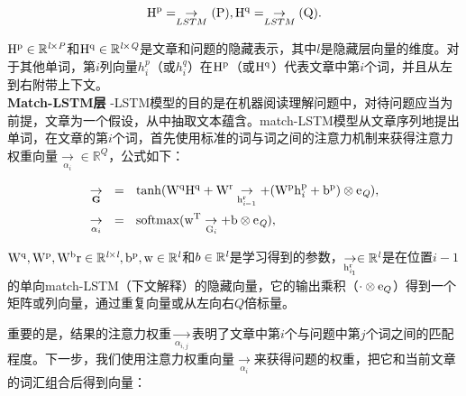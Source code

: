 \documentclass{article}
\begin{document}
\begin{CJK*}{UTF8}{gbsn}
    \begin{equation}                  
        {{\rm H^{p}} = \underset{LSTM}\rightarrow}~{\rm (P)}, {\rm H^{q}} = \underset{LSTM}\rightarrow{\rm (Q)}.              
    \end{equation}

    \vspace{1ex}
    $\rm H^{p}\in \mathbb{R}^{\emph l \times \emph P}$和$\rm H^{q}\in \mathbb{R}^{\emph l \times \emph Q}$是文章和问题的隐藏表示，其中$l$是隐藏层向量的维度。对于其他单词，第$i$列向量$h^{p}_{i}$（或$h^q_{i}$）在$\rm H^{p}$（或$\rm H^{q}$）代表文章中第$i$个词，并且从左到右附带上下文。\\

    \vspace{1ex}
    \noindent\textbf{Match-LSTM层}
    \vspace{1ex}
    -LSTM模型的目的是在机器阅读理解问题中，对待问题应当为前提，文章为一个假设，从中抽取文本蕴含。match-LSTM模型从文章序列地提出单词，在文章的第$i$个词，首先使用标准的词与词之间的注意力机制来获得注意力权重向量$\underset{\alpha_{i}}\rightarrow \in \mathbb{R}^{Q}$，公式如下：

    \begin{equation}
        \begin{split}
            \underset{\textbf G}\rightarrow ~~ &= ~~ \tanh({\rm W^{q}H^{q} + W^{r}\underset{h_{\emph i-1}^{r}}\rightarrow + (W^{p}h_{\emph i}^{p} + b^{p}) \otimes e_{\emph Q}}),\\
            \underset{\alpha_{i}}\rightarrow ~~ &= ~~ \rm softmax(w^{T}\underset{G_{\emph i}}\rightarrow + b \otimes e_{\emph Q}),
        \end{split}
    \end{equation}

    \vspace{1ex}
    $\rm W^{q}, W^{p},W^b{r} \in \mathbb{R}^{\emph l \times \emph l},b^{p},w \in \mathbb{R}^{\emph l}$和$b \in \mathbb{R}^{\emph l}$是学习得到的参数，$\rm \underset{h_{\emph i_1}^{r}}\rightarrow \in \mathbb{R}^{\emph l}$是在位置$i-1$的单向match-LSTM（下文解释）的隐藏向量，它的输出乘积（$\cdot \otimes {\rm e}_{Q}$）得到一个矩阵或列向量，通过重复向量或从左向右$Q$倍标量。

    \vspace{1ex}\noindent
    重要的是，结果的注意力权重$\underset{\alpha_{i, j}}\rightarrow$表明了文章中第$i$个与问题中第$j$个词之间的匹配程度。下一步，我们使用注意力权重向量$\underset{\alpha_{i}}\rightarrow$来获得问题的权重，把它和当前文章的词汇组合后得到向量：


\end{CJK*}
\end{document}

